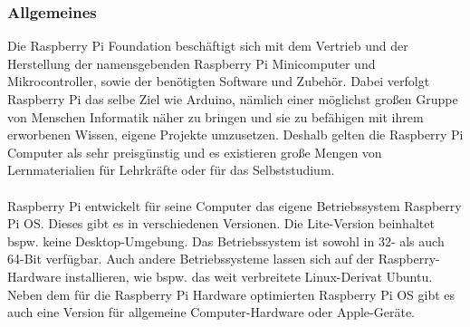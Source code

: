 \subsubsection{Allgemeines}
Die Raspberry Pi Foundation beschäftigt sich mit dem Vertrieb und der Herstellung der namensgebenden Raspberry Pi Minicomputer und Mikrocontroller, sowie der benötigten Software und Zubehör. Dabei verfolgt Raspberry Pi das selbe Ziel wie Arduino, nämlich einer möglichst großen Gruppe von Menschen Informatik näher zu bringen und sie zu befähigen mit ihrem erworbenen Wissen, eigene Projekte umzusetzen. Deshalb gelten die Raspberry Pi Computer als sehr preisgünstig und es existieren große Mengen von Lernmaterialien für Lehrkräfte oder für das Selbststudium. \cite{raspberry_home}\\\\
Raspberry Pi entwickelt für seine Computer das eigene Betriebssystem \glqq{}Raspberry Pi OS\grqq{}. Dieses gibt es in verschiedenen Versionen. Die \glqq{}Lite\grqq{}-Version beinhaltet bspw. keine Desktop-Umgebung. Das Betriebssystem ist sowohl in 32- als auch 64-Bit verfügbar. Auch andere Betriebssysteme lassen sich auf der Raspberry-Hardware installieren, wie bspw. das weit verbreitete Linux-Derivat \glqq{}Ubuntu\grqq{}. Neben dem für die Raspberry Pi Hardware optimierten Raspberry Pi OS gibt es auch eine Version für allgemeine Computer-Hardware oder Apple-Geräte.
